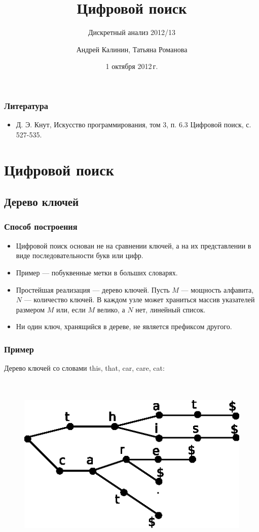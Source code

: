 \documentclass[hyperref={unicode=true}]{beamer}
\title{Цифровой поиск}
\subtitle{Дискретный анализ 2012/13}
\author{Андрей Калинин, Татьяна Романова}
\date{1 октября 2012\,г. }
\begin{document}
\newcommand{\tnd}[1]{\Tcircle{\makebox[5mm][c]{#1}}}
\newcommand{\nilnd} {\Tp[edge=none]}
\newcommand{\rednd}[1]{\Tcircle[linecolor=red!30, %
    fillstyle=solid, fillcolor=red!30] {\makebox[5mm][c]{#1}}}
\newcommand{\blacknd}[1]{\Tcircle[linecolor=black!20, %
    fillstyle=solid, fillcolor=black!20]{\makebox[5mm][c]{#1}}}

\frame {\titlepage}

\frame
{ 
\frametitle{Литература}
  \begin{itemize}
    \item Д. Э. Кнут, Искусство программирования, том 3, п. 6.3 Цифровой поиск, с.\,527-535.
  \end{itemize}
}

\section{Цифровой поиск}
\subsection{Дерево ключей}

\frame
{
  \frametitle{Способ построения}
  \begin{itemize}
    \item Цифровой поиск основан не на сравнении ключей, а на их представлении в виде последовательности букв или цифр.
    \item Пример --- побуквенные метки в больших словарях.
    \item Простейшая реализация --- дерево ключей. Пусть $M$ --- мощность алфавита, $N$ --- количество ключей. В каждом узле может храниться массив указателей размером $M$ или, если $M$ велико, а $N$ нет, линейный список.
    \item Ни один ключ, хранящийся в дереве, не является префиксом другого.
  \end{itemize}
}

\frame
{
  \frametitle{Пример}
  Дерево ключей со словами this, that, car, care, cat:\\
~\\
~\\
  \begin{figure}[h!]
  \centerline{\includegraphics{keytree.eps}}
  \end{figure}
}
\end{document}
